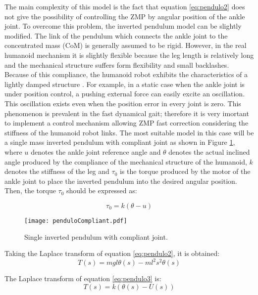 The main complexity of this model is the fact that equation \eqref{eq:pendulo2} does not give the possibility of controlling the ZMP by angular position of the ankle joint. To overcome this problem, the inverted pendulum model can be slightly modified. The link of the pendulum which connects the ankle joint to the concentrated mass (CoM) is generally assumed to be rigid. However, in the real humanoid mechanism it is slightly flexible because the leg length is relatively long and the mechanical structure suffers form flexibility and small backlashes. Because of this compliance, the humanoid robot exhibits the characteristics of a lightly damped structure \cite{Kim2004}. For example, in a static case when the ankle joint is under position control, a pushing external force can easily excite an oscillation. This oscillation exists even when the position error in every joint is zero. This phenomenon is prevalent in the fast dynamical gait; therefore it is very imortant to implement a control mechanism allowing ZMP fast correction considering the stiffness of the humanoid robot links. The most suitable model in this case will be a single mass inverted pendulum with compliant joint as shown in Figure \ref{fig:pendulo_elast}, where $u$ denotes the ankle joint reference angle and $\theta$ denotes the actual inclined angle produced by the compliance of the mechanical structure of the humanoid, $k$ denotes the stiffness of the leg and $\tau_0$ is the torque produced by the motor of the ankle joint to place the inverted pendulum into the desired angular position. Then, the torque $\tau_0$ should be expressed as:

\begin{equation}
\tau_0 = k(\theta - u)
\label{eq:pendulo3}
\end{equation}

\begin{figure}
\centering
\texttt{[image: penduloCompliant.pdf]}
\caption{Single inverted pendulum with compliant joint.}
\label{fig:pendulo_elast}
\end{figure}

Taking the Laplace transform of equation \ref{eq:pendulo2}, it is obtained: 
\begin{equation}
T(s) = mgl\theta(s)- ml^2s^2\theta(s) 
\label{eq:par}
\end{equation}

The Laplace transform of equation \eqref{eq:pendulo3} is:
\begin{equation}
T(s) = k(\theta(s) - U(s))
\label{eq:par2}
\end{equation}

